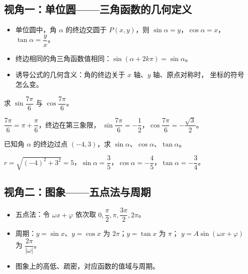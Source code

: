 \begin{explore}

\subsection{视角一：单位圆——三角函数的几何定义}

\begin{itemize}
  \item 单位圆中，角 $\alpha$ 的终边交圆于 $P(x,y)$，则 $\sin\alpha=y$，$\cos\alpha=x$，
        $\tan\alpha=\dfrac{y}{x}$。
  \item 终边相同的角三角函数值相同：$\sin(\alpha+2k\pi)=\sin\alpha$。
  \item 诱导公式的几何含义：角的终边关于 $x$ 轴、$y$ 轴、原点对称时，
        坐标的符号怎么变。
\end{itemize}

\begin{example}
求 $\sin\dfrac{7\pi}{6}$ 与 $\cos\dfrac{7\pi}{6}$。
\end{example}
\begin{solution}
$\dfrac{7\pi}{6}=\pi+\dfrac{\pi}{6}$，终边在第三象限，
$\sin\dfrac{7\pi}{6}=-\dfrac12$，$\cos\dfrac{7\pi}{6}=-\dfrac{\sqrt3}{2}$。
\end{solution}

\begin{problem}
已知角 $\alpha$ 的终边过点 $(-4,3)$，求 $\sin\alpha$、$\cos\alpha$、$\tan\alpha$。
\end{problem}
\begin{solution}
$r=\sqrt{(-4)^2+3^2}=5$，$\sin\alpha=\dfrac35$，$\cos\alpha=-\dfrac45$，$\tan\alpha=-\dfrac34$。
\end{solution}

\subsection{视角二：图象——五点法与周期}

\begin{itemize}
  \item 五点法：令 $\omega x+\varphi$ 依次取 $0,\dfrac{\pi}{2},\pi,\dfrac{3\pi}{2},2\pi$。
  \item 周期：$y=\sin x$、$y=\cos x$ 为 $2\pi$；$y=\tan x$ 为 $\pi$；
        $y=A\sin(\omega x+\varphi)$ 为 $\dfrac{2\pi}{|\omega|}$。
  \item 图象上的高低、疏密，对应函数的值域与周期。
\end{itemize}


\end{explore}

